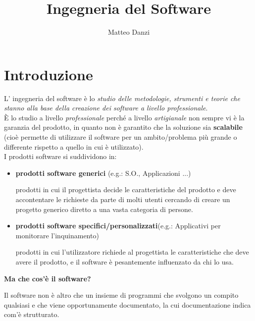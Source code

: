 \documentclass[a4paper, 10pt]{article}
\title{Ingegneria del Software}
\date{}
\author{Matteo Danzi}
\begin{document}
	\maketitle
	
	\tableofcontents
	
	\newpage
	
	\section{Introduzione}
	L' ingegneria del software è lo \textit{studio delle metodologie, strumenti e teorie che
		stanno alla base della creazione dei software a livello professionale}.\\
	
	\noindent
	È lo studio a livello \textit{professionale} perché a livello \textit{artigianale} non sempre vi è la garanzia del prodotto, in quanto non è garantito che la soluzione sia \textbf{scalabile} (cioè
	permette di utilizzare il software per un ambito/problema più grande o differente rispetto a quello in cui è utilizzato).\\
	I prodotti software si suddividono in:
	\begin{itemize}
		\item \textbf{prodotti software generici} (e.g.: S.O., Applicazioni ...)
		
		prodotti in cui il progettista decide le caratteristiche del prodotto e deve accontentare le richieste da parte di molti utenti cercando di creare un progetto generico diretto a  una vasta categoria di persone.
		\item \textbf{prodotti software specifici/personalizzati}(e.g.: Applicativi per monitorare l'inquinamento)
		
		prodotti in cui l'utilizzatore richiede al progettista le caratteristiche che deve avere il prodotto, e il software è pesantemente influenzato da chi lo usa.
	\end{itemize}
	
	\noindent
	\textbf{Ma che cos'è il software?} 
	
	\noindent
	Il software non è altro che un insieme di programmi che svolgono un compito qualsiasi e che viene opportunamente documentato, la cui documentazione indica com'è strutturato. \\
	
	\noindent
\end{document}
